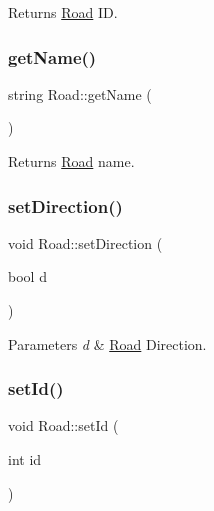 \begin{DoxyReturn}{Returns}
\hyperlink{class_road}{Road} ID. 
\end{DoxyReturn}
\mbox{\label{class_road_a900c77eae1c7adc71f2a0a4afd2fb904}} 
\subsubsection{\texorpdfstring{get\+Name()}{getName()}}
{\footnotesize\ttfamily string Road\+::get\+Name (\begin{DoxyParamCaption}{ }\end{DoxyParamCaption})}

\begin{DoxyReturn}{Returns}
\hyperlink{class_road}{Road} name. 
\end{DoxyReturn}
\mbox{\label{class_road_a3df961399de73d0278ad1ff76dc0e886}} 
\subsubsection{\texorpdfstring{set\+Direction()}{setDirection()}}
{\footnotesize\ttfamily void Road\+::set\+Direction (\begin{DoxyParamCaption}\item[{bool}]{d }\end{DoxyParamCaption})}


\begin{DoxyParams}{Parameters}
{\em d} & \hyperlink{class_road}{Road} Direction. \\
\hline
\end{DoxyParams}
\mbox{\label{class_road_abb20db3e412a088553dfacc862bb9f32}} 
\subsubsection{\texorpdfstring{set\+Id()}{setId()}}
{\footnotesize\ttfamily void Road\+::set\+Id (\begin{DoxyParamCaption}\item[{int}]{id }\end{DoxyParamCaption})}


